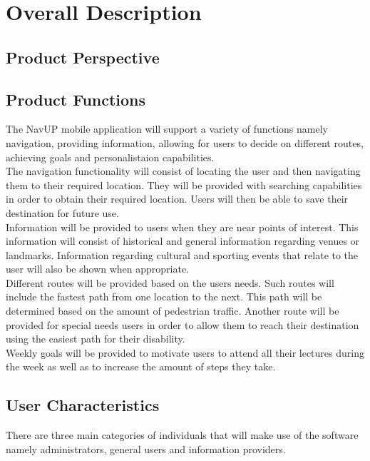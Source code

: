 \documentclass[12pt,a4paper]{report}
\begin{document}
\section*{Overall Description}
	\subsection*{Product Perspective}
	\subsection*{Product Functions}
	The NavUP mobile application will support a variety of functions namely navigation, providing information, allowing for users to decide on different routes, achieving goals and personalistaion capabilities.
\\

The navigation functionality will consist of locating the user and then navigating them to their required location. They will be provided with searching capabilities in order to obtain their required location. Users will then be able to save their destination for future use.
\\

Information will be provided to users when they are near points of interest. This information will consist of historical and general information regarding venues or landmarks. Information regarding cultural and sporting events that relate to the user will also be shown when appropriate.
\\

Different routes will be provided based on the users needs. Such routes will include the fastest path from one location to the next. This path will be determined based on the amount of pedestrian traffic. Another route will be provided for special needs users in order to allow them to reach their destination using the easiest path for their disability. 
\\

Weekly goals will be provided to motivate users to attend all their lectures during the week as well as to increase the amount of steps they take.

\subsection*{User Characteristics}
There are three main categories of individuals that will make use of the software namely administrators, general users and information providers.
	\\		
\end{document}
